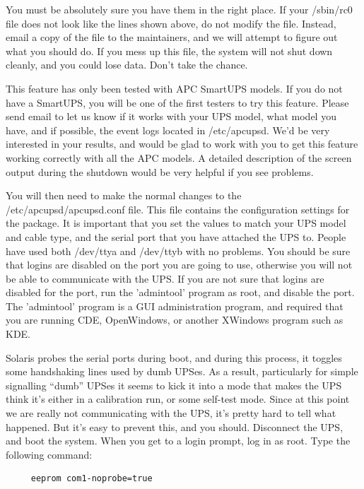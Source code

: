 You must be absolutely sure you have them in the right place. If your
/sbin/rc0 file does not look like the lines shown above, do not modify the
file. Instead, email a copy of the file to the maintainers, and we will
attempt to figure out what you should do. If you mess up this file, the system
will not shut down cleanly, and you could lose data. Don't take the chance.  

This feature has only been tested with APC SmartUPS models. If you do not have
a SmartUPS, you will be one of the first testers to try this feature. Please
send email to let us know if it works with your UPS model, what model you
have, and if possible, the event logs located in /etc/apcupsd. We'd be very
interested in your results, and would be glad to work with you to get this
feature working correctly with all the APC models. A detailed description of
the screen output during the shutdown would be very helpful if you see
problems.  

You will then need to make the normal changes to the /etc/apcupsd/apcupsd.conf
file. This file contains the configuration settings for the package. It is
important that you set the values to match your UPS model and cable type, and
the serial port that you have attached the UPS to.  People have used both
/dev/ttya and /dev/ttyb with no problems. You should be sure that logins are
disabled on the port you are going to use, otherwise you will not be able to
communicate with the UPS. If you are not sure that logins are disabled for the
port, run the 'admintool' program as root, and disable the port. The
'admintool' program is a GUI administration program, and required that you are
running CDE, OpenWindows, or another XWindows program such as KDE.  

Solaris probes the serial ports during boot, and during this process, it
toggles some handshaking lines used by dumb UPSes. As a result, particularly
for simple signalling ``dumb'' UPSes it seems to kick it into a mode that
makes the UPS think it's either in a calibration run, or some self-test mode.
Since at this point we are really not communicating with the UPS, it's pretty
hard to tell what happened. But it's easy to prevent this, and you should.
Disconnect the UPS, and boot the system. When you get to a login prompt, log
in as root. Type the following command: 

\footnotesize
\begin{verbatim}
     eeprom com1-noprobe=true
\end{verbatim}
\normalsize

